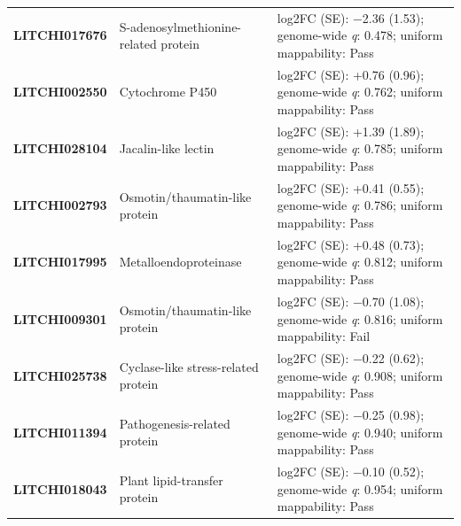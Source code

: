 \documentclass[12pt,letterpaper]{article}
\begin{document}
\begin{longtable}{@{}>{\raggedright\arraybackslash}p{}>{\raggedright\arraybackslash}p{}>{\raggedright\arraybackslash}p{}@{}}
\textbf{LITCHI017676} & S-adenosylmethionine-related protein & log2FC (SE): −2.36 (1.53); genome-wide \textit{q}: 0.478; uniform mappability: Pass \\
\textbf{LITCHI002550} & Cytochrome P450 & log2FC (SE): +0.76 (0.96); genome-wide \textit{q}: 0.762; uniform mappability: Pass \\
\textbf{LITCHI028104} & Jacalin-like lectin & log2FC (SE): +1.39 (1.89); genome-wide \textit{q}: 0.785; uniform mappability: Pass \\
\textbf{LITCHI002793} & Osmotin/thaumatin-like protein & log2FC (SE): +0.41 (0.55); genome-wide \textit{q}: 0.786; uniform mappability: Pass \\
\textbf{LITCHI017995} & Metalloendoproteinase & log2FC (SE): +0.48 (0.73); genome-wide \textit{q}: 0.812; uniform mappability: Pass \\
\textbf{LITCHI009301} & Osmotin/thaumatin-like protein & log2FC (SE): −0.70 (1.08); genome-wide \textit{q}: 0.816; uniform mappability: Fail \\
\textbf{LITCHI025738} & Cyclase-like stress-related protein & log2FC (SE): −0.22 (0.62); genome-wide \textit{q}: 0.908; uniform mappability: Pass \\
\textbf{LITCHI011394} & Pathogenesis-related protein & log2FC (SE): −0.25 (0.98); genome-wide \textit{q}: 0.940; uniform mappability: Pass \\
\textbf{LITCHI018043} & Plant lipid-transfer protein & log2FC (SE): −0.10 (0.52); genome-wide \textit{q}: 0.954; uniform mappability: Pass \\
\end{longtable}
\end{document}
